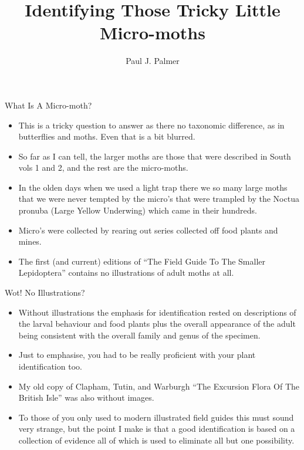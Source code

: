 \documentclass[
  ignorenonframetext,
]{beamer}
\title{Identifying Those Tricky Little Micro-moths}
\author{Paul J. Palmer}
\date{}
\providecommand{\tightlist}{%
  \setlength{\itemsep}{0pt}\setlength{\parskip}{0pt}}
\begin{document}
\frame{\titlepage}

\begin{frame}{What Is A Micro-moth?}
\protect\hypertarget{what-is-a-micro-moth}{}
\begin{itemize}
\tightlist
\item
  This is a tricky question to answer as there no taxonomic difference,
  as in butterflies and moths. Even that is a bit blurred.
\item
  So far as I can tell, the larger moths are those that were described
  in South vols 1 and 2, and the rest are the micro-moths.
\item
  In the olden days when we used a light trap there we so many large
  moths that we were never tempted by the micro's that were trampled by
  the Noctua pronuba (Large Yellow Underwing) which came in their
  hundreds.
\item
  Micro's were collected by rearing out series collected off food plants
  and mines.
\item
  The first (and current) editions of ``The Field Guide To The Smaller
  Lepidoptera'' contains no illustrations of adult moths at all.
\end{itemize}
\end{frame}

\begin{frame}{Wot! No Illustrations?}
\protect\hypertarget{wot-no-illustrations}{}
\begin{itemize}
\tightlist
\item
  Without illustrations the emphasis for identification rested on
  descriptions of the larval behaviour and food plants plus the overall
  appearance of the adult being consistent with the overall family and
  genus of the specimen.
\item
  Just to emphasise, you had to be really proficient with your plant
  identification too.
\item
  My old copy of Clapham, Tutin, and Warburgh ``The Excursion Flora Of
  The British Isle'' was also without images.
\item
  To those of you only used to modern illustrated field guides this must
  sound very strange, but the point I make is that a good identification
  is based on a collection of evidence all of which is used to eliminate
  all but one possibility.
\end{itemize}
\end{frame}
\end{document}
